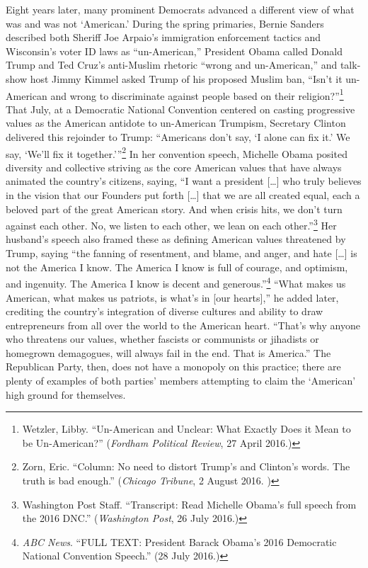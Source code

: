 Eight years later, many prominent Democrats advanced a different view of
what was and was not `American.' During the spring primaries, Bernie
Sanders described both Sheriff Joe Arpaio's immigration enforcement
tactics and Wisconsin's voter ID laws as ``un-American,'' President
Obama called Donald Trump and Ted Cruz's anti-Muslim rhetoric ``wrong
and un-American,'' and talk-show host Jimmy Kimmel asked Trump of his
proposed Muslim ban, ``Isn't it un-American and wrong to discriminate
against people based on their religion?''\footnote{Wetzler, Libby.
  ``Un-American and Unclear: What Exactly Does it Mean to be
  Un-American?'' (\emph{Fordham Political Review}, 27 April 2016.)}
That July, at a Democratic National Convention centered on casting
progressive values as the American antidote to un-American Trumpism,
Secretary Clinton delivered this rejoinder to Trump: ``Americans don't
say, `I alone can fix it.' We say, `We'll fix it together.'''\footnote{Zorn,
  Eric. ``Column: No need to distort Trump's and Clinton's words. The
  truth is bad enough.'' (\textit{Chicago Tribune}, 2 August 2016.
 )}
In her convention speech, Michelle Obama posited diversity and
collective striving as the core American values that have always
animated the country's citizens, saying, ``I want a president
{[}\ldots{}{]} who truly believes in the vision that our Founders put
forth {[}\ldots{}{]} that we are all created equal, each a beloved part
of the great American story. And when crisis hits, we don't turn against
each other. No, we listen to each other, we lean on each
other.''\footnote{Washington {Post} Staff. ``Transcript: Read
  Michelle Obama's full speech from the 2016 DNC.'' (\textit{Washington Post}, 26 July 2016.)}
Her husband's speech also framed these as defining American values
threatened by Trump, saying ``the fanning of resentment, and blame, and
anger, and hate {[}\ldots{}{]} is not the America I know. The America I
know is full of courage, and optimism, and ingenuity. The America I know
is decent and generous.''\footnote{\emph{ABC News}. ``FULL TEXT:
  President Barack Obama's 2016 Democratic National Convention Speech.''
  (28 July 2016.)}
``What makes us American, what makes us patriots, is what's in {[}our
hearts{]},'' he added later, crediting the country's integration of
diverse cultures and ability to draw entrepreneurs from all over the
world to the American heart. ``That's why anyone who threatens our
values, whether fascists or communists or jihadists or homegrown
demagogues, will always fail in the end. That is America.'' The
Republican Party, then, does not have a monopoly on this practice; there
are plenty of examples of both parties' members attempting to claim the
`American' high ground for themselves.

